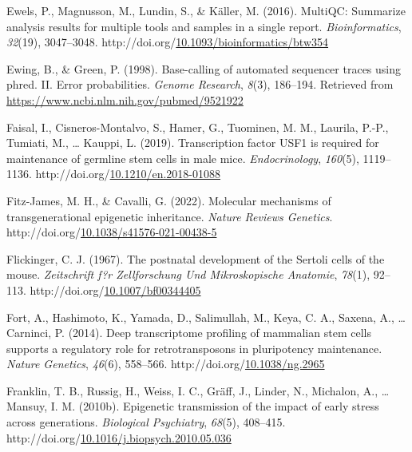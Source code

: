 \documentclass[12pt,twoside]{reedthesis}
\newlength{\cslhangindent}
\newenvironment{CSLReferences}[2] %
 {%
  \setlength{\parindent}{0pt}
  \ifodd #1 \everypar{\setlength{\hangindent}{\cslhangindent}}\ignorespaces\fi
  \ifnum #2 > 0
  \setlength{\parskip}{#2\baselineskip}
  \fi
 }%
 {}
\begin{document}
\begin{CSLReferences}{1}{0}
\leavevmode{}%
Ewels, P., Magnusson, M., Lundin, S., \& Käller, M. (2016). MultiQC: Summarize analysis results for multiple tools and samples in a single report. \emph{Bioinformatics}, \emph{32}(19), 3047--3048. http://doi.org/\href{https://doi.org/10.1093/bioinformatics/btw354}{10.1093/bioinformatics/btw354}

\leavevmode{}%
Ewing, B., \& Green, P. (1998). Base-calling of automated sequencer traces using phred. II. Error probabilities. \emph{Genome Research}, \emph{8}(3), 186--194. Retrieved from \url{https://www.ncbi.nlm.nih.gov/pubmed/9521922}

\leavevmode{}%
Faisal, I., Cisneros-Montalvo, S., Hamer, G., Tuominen, M. M., Laurila, P.-P., Tumiati, M., \ldots{} Kauppi, L. (2019). Transcription factor USF1 is required for maintenance of germline stem cells in male mice. \emph{Endocrinology}, \emph{160}(5), 1119--1136. http://doi.org/\href{https://doi.org/10.1210/en.2018-01088}{10.1210/en.2018-01088}

\leavevmode{}%
Fitz-James, M. H., \& Cavalli, G. (2022). Molecular mechanisms of transgenerational epigenetic inheritance. \emph{Nature Reviews Genetics}. http://doi.org/\href{https://doi.org/10.1038/s41576-021-00438-5}{10.1038/s41576-021-00438-5}

\leavevmode{}%
Flickinger, C. J. (1967). The postnatal development of the Sertoli cells of the mouse. \emph{Zeitschrift f?r Zellforschung Und Mikroskopische Anatomie}, \emph{78}(1), 92--113. http://doi.org/\href{https://doi.org/10.1007/bf00344405}{10.1007/bf00344405}

\leavevmode{}%
Fort, A., Hashimoto, K., Yamada, D., Salimullah, M., Keya, C. A., Saxena, A., \ldots{} Carninci, P. (2014). Deep transcriptome profiling of mammalian stem cells supports a regulatory role for retrotransposons in pluripotency maintenance. \emph{Nature Genetics}, \emph{46}(6), 558--566. http://doi.org/\href{https://doi.org/10.1038/ng.2965}{10.1038/ng.2965}

\leavevmode{}%
Franklin, T. B., Russig, H., Weiss, I. C., Gräff, J., Linder, N., Michalon, A., \ldots{} Mansuy, I. M. (2010b). Epigenetic transmission of the impact of early stress across generations. \emph{Biological Psychiatry}, \emph{68}(5), 408--415. http://doi.org/\href{https://doi.org/10.1016/j.biopsych.2010.05.036}{10.1016/j.biopsych.2010.05.036}


\end{CSLReferences}
\end{document}
